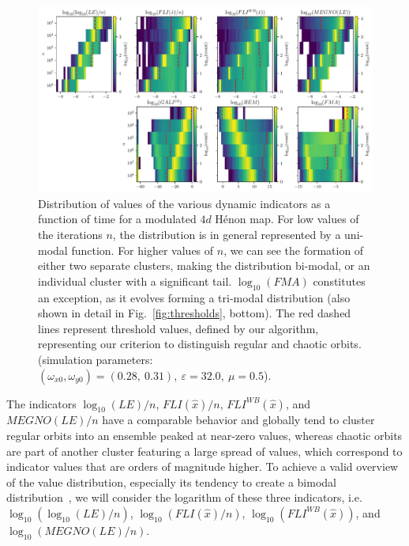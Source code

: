 \begin{chapterappendices}
\begin{figure}[ht]
    \includegraphics[width=\textwidth]{6_dynamic_indicators/fig/corrected_figs/evolution_idx_3.pdf}
    \caption{Distribution of values of the various dynamic indicators as a function of time for a modulated $4d$ Hénon map. For low values of the  iterations $n$, the distribution is in general represented by a uni-modal function. For higher values of $n$, we can see the formation of either two separate clusters, making the distribution bi-modal, or an individual cluster with a significant tail. $\log_{10}(FMA)$ constitutes an exception, as it evolves forming a tri-modal distribution (also shown in detail in Fig.~\ref{fig:thresholds}, bottom).
    The red dashed lines represent threshold values, defined by our algorithm, representing our criterion to distinguish regular and chaotic orbits. (simulation parameters: $(\omega_{x0},\omega_{y0})= (0.28,\ 0.31),\ \varepsilon=32.0,\ \mu=0.5$).}
    \label{fig:generic_example_2}
\end{figure}



The indicators $\log_{10}(LE)/n$, $FLI(\hat{x})/n$, $FLI^{WB}(\hat{x})$, and $MEGNO(LE)/n$ have a comparable behavior and globally tend to cluster regular orbits into an ensemble peaked at near-zero values, whereas chaotic orbits are part of another cluster featuring a large spread of values, which correspond to indicator values that are orders of magnitude higher. To achieve a valid overview of the value distribution, especially its tendency to create a bimodal distribution~\cite{PhysRevE.60.2761,VALLEJO200326}, we will consider the logarithm of these three indicators, i.e.~$\log_{10}(\log_{10}(LE)/n)$, $\log_{10}(FLI(\hat{x})/n)$, $\log_{10}(FLI^{WB}(\hat{x}))$, and $\log_{10}(MEGNO(LE)/n)$.


\end{chapterappendices}
